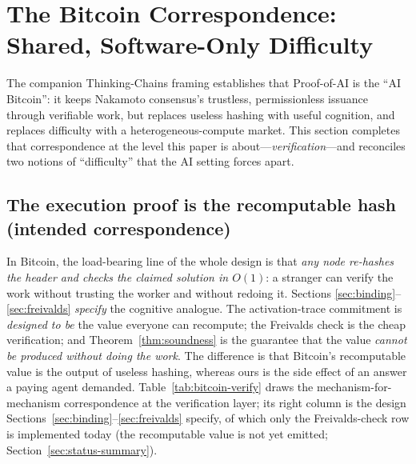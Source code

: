 \section{The Bitcoin Correspondence: Shared, Software-Only Difficulty}
\label{sec:difficulty}

The companion Thinking-Chains framing establishes that Proof-of-AI is the ``AI
Bitcoin'': it keeps Nakamoto consensus's trustless, permissionless issuance through
verifiable work, but replaces useless hashing with useful cognition, and replaces
difficulty with a heterogeneous-compute market. This section completes that
correspondence at the level this paper is about---\emph{verification}---and
reconciles two notions of ``difficulty'' that the AI setting forces apart.

\subsection{The execution proof is the recomputable hash (intended correspondence)}

In Bitcoin, the load-bearing line of the whole design is that \emph{any node
re-hashes the header and checks the claimed solution in $O(1)$}: a stranger can
verify the work without trusting the worker and without redoing it. Sections
\ref{sec:binding}--\ref{sec:freivalds} \emph{specify} the cognitive analogue. The
activation-trace commitment is \emph{designed to be} the value everyone can recompute;
the Freivalds check
is the cheap verification; and Theorem~\ref{thm:soundness} is the guarantee that the
value \emph{cannot be produced without doing the work}. The difference is that
Bitcoin's recomputable value is the output of useless hashing, whereas ours is the
side effect of an answer a paying agent demanded. Table~\ref{tab:bitcoin-verify}
draws the mechanism-for-mechanism correspondence at the verification layer; its
right column is the design Sections~\ref{sec:binding}--\ref{sec:freivalds} specify, of
which only the Freivalds-check row is implemented today (the recomputable value is not
yet emitted; Section~\ref{sec:status-summary}).

